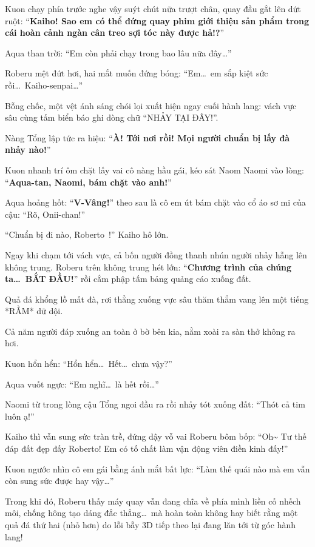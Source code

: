 \documentclass[../main.tex]{subfiles}
\begin{document}
Kuon chạy phía trước nghe vậy suýt chút nữa trượt chân, quay đầu gắt lên dứt ruột: ``\textbf{Kaiho! Sao em có thể đứng quay phim giới thiệu sản phẩm trong cái hoàn cảnh ngàn cân treo sợi tóc này được hả!?}''

Aqua than trời: ``Em còn phải chạy trong bao lâu nữa đây\dots''

Roberu mệt đứt hơi, hai mắt muốn đứng bóng: ``Em\dots\ em sắp kiệt sức rồi\dots\ Kaiho-senpai\dots''

Bỗng chốc, một vệt ánh sáng chói lọi xuất hiện ngay cuối hành lang: vách vực sâu cùng tấm biển báo ghi dòng chữ ``NHẢY TẠI ĐÂY!''.


Nàng Tổng lập tức ra hiệu: ``\textbf{À! Tới nơi rồi! Mọi người chuẩn bị lấy đà nhảy nào!}''

Kuon nhanh trí ôm chặt lấy vai cô nàng hầu gái, kéo sát Naom Naomi vào lòng: ``\textbf{Aqua-tan, Naomi, bám chặt vào anh!}''

Aqua hoảng hốt: ``\textbf{V-Vâng!}'' theo sau là cô em út bám chặt vào cổ áo sơ mi của cậu: ``Rõ, Onii-chan!''

``Chuẩn bị đi nào, Roberto~!'' Kaiho hô lớn.

Ngay khi chạm tới vách vực, cả bốn người đồng thanh nhún người nhảy hẫng lên không trung. Roberu trên không trung hét lớn: ``\textbf{Chương trình của chúng ta\dots\ BẮT ĐẦU!}'' rồi cắm phập tấm bảng quảng cáo xuống đất.


Quả đá khổng lồ mất đà, rơi thẳng xuống vực sâu thăm thẳm vang lên một tiếng *RẦM* dữ dội.

Cả năm người đáp xuống an toàn ở bờ bên kia, nằm xoài ra sàn thở không ra hơi.

Kuon hổn hển: ``Hổn hển\dots\ Hết\dots\ chưa vậy?''

Aqua vuốt ngực: ``Em nghĩ\dots\ là hết rồi\dots''

Naomi từ trong lòng cậu Tổng ngoi đầu ra rồi nhảy tót xuống đất: ``Thót cả tim luôn ạ!''

Kaiho thì vẫn sung sức tràn trề, đứng dậy vỗ vai Roberu bôm bốp: ``Oh\~{} Tư thế đáp đất đẹp đấy Roberto! Em có tố chất làm vận động viên điền kinh đấy!''

Kuon ngước nhìn cô em gái bằng ánh mắt bất lực: ``Làm thế quái nào mà em vẫn còn sung sức được hay vậy\dots''

Trong khi đó, Roberu thấy máy quay vẫn đang chĩa về phía mình liền cố nhếch môi, chống hông tạo dáng đắc thắng\dots\ mà hoàn toàn không hay biết rằng một quả đá thứ hai (nhỏ hơn) do lỗi bẫy 3D tiếp theo lại đang lăn tới từ góc hành lang!
\end{document}
